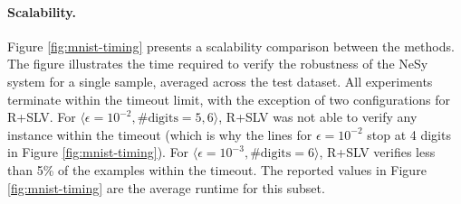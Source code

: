 
\paragraph{Scalability.} Figure \ref{fig:mnist-timing} presents a scalability comparison between the methods. The figure illustrates the time required to verify the robustness of the NeSy system for a single sample, averaged across the test dataset. All experiments terminate within the timeout limit, with the exception of two configurations for \textsc{R+SLV}. For $\langle \epsilon=10^{-2}, \#\text{digits}=5, 6 \rangle$, \textsc{R+SLV} was not able to verify any instance within the timeout (which is why the lines for $\epsilon=10^{-2}$ stop at 4 digits in Figure \ref{fig:mnist-timing}). For $\langle \epsilon=10^{-3}, \#\text{digits}=6 \rangle$, \textsc{R+SLV} verifies less than 5\% of the examples within the timeout. The reported values in Figure \ref{fig:mnist-timing} are the average runtime for this subset. 


